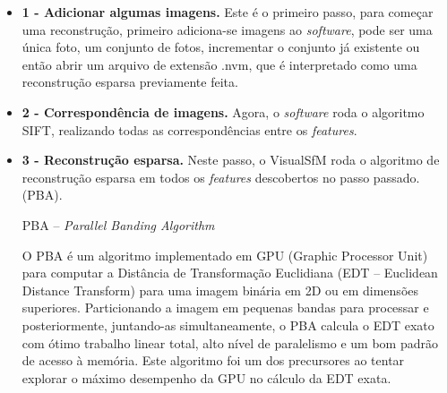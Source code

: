\begin{itemize}
\item \textbf{1 - Adicionar algumas imagens.} Este é o primeiro passo, para começar uma reconstrução, primeiro adiciona-se imagens ao {\it software}, pode ser uma única foto, um conjunto de fotos, incrementar o conjunto já existente ou então abrir um arquivo de extensão .nvm, que é interpretado como uma reconstrução esparsa previamente feita.

\item \textbf{2 - Correspondência de imagens.} Agora, o {\it software} roda o algoritmo SIFT, realizando todas as correspondências entre os {\it features}.

\item \textbf{3 - Reconstrução esparsa.} Neste passo, o VisualSfM roda o algoritmo de reconstrução esparsa em todos os {\it features} descobertos no passo passado. (PBA). %


PBA -- {\it Parallel Banding Algorithm}

O PBA é um algoritmo implementado em GPU (Graphic Processor Unit) para computar a Distância de Transformação Euclidiana (EDT -- Euclidean Distance Transform) para uma imagem binária em 2D ou em dimensões superiores. Particionando a imagem em pequenas bandas para processar e posteriormente, juntando-as simultaneamente, o PBA calcula o EDT exato com ótimo trabalho linear total, alto nível de paralelismo e um bom padrão de acesso à memória. Este algoritmo foi um dos precursores ao tentar explorar o máximo desempenho da GPU no cálculo da EDT exata. 






\end{itemize}
